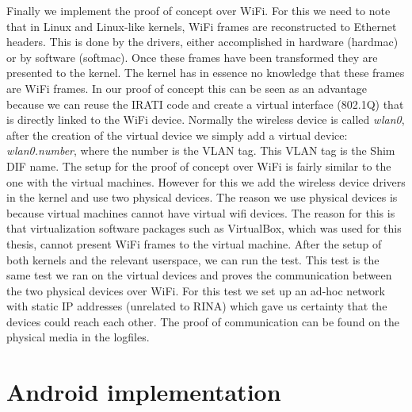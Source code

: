 Finally we implement the proof of concept over WiFi. For this we need to note that in Linux and Linux-like kernels, WiFi frames are reconstructed to Ethernet headers. This is done by the drivers, either accomplished in hardware (hardmac) or by software (softmac). Once these frames have been transformed they are presented to the kernel. The kernel has in essence no knowledge that these frames are WiFi frames. In our proof of concept this can be seen as an advantage because we can reuse the IRATI code and create a virtual interface (802.1Q) that is directly linked to the WiFi device. Normally the wireless device is called \emph{wlan0}, after the creation of the virtual device we simply add a virtual device: \emph{wlan0.number}, where the number is the VLAN tag. This VLAN tag is the Shim DIF name.
\npar
The setup for the proof of concept over WiFi is fairly similar to the one with the virtual machines. However for this we add the wireless device drivers in the kernel and use two physical devices. The reason we use physical devices is because virtual machines cannot have virtual wifi devices. The reason for this is that virtualization software packages such as VirtualBox, which was used for this thesis, cannot present WiFi frames to the virtual machine. 
\npar
After the setup of both kernels and the relevant userspace, we can run the test. This test is the same test we ran on the virtual devices and proves the communication between the two physical devices over WiFi. For this test we set up an ad-hoc network with static IP addresses (unrelated to RINA) which gave us certainty that the devices could reach each other. The proof of communication can be found on the physical media in the logfiles.

\section{Android implementation}

